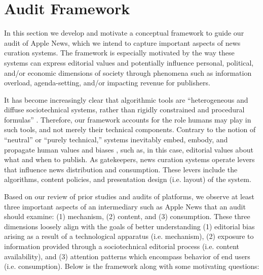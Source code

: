 \section{Audit Framework}\label{sec-framework}

In this section we develop and motivate a conceptual framework to guide our audit of Apple News, which we intend to capture important aspects of news curation systems. The framework is especially motivated by the way these systems can express editorial values and potentially influence personal, political, and/or economic dimensions of society through phenomena such as information overload, agenda-setting, and/or impacting  revenue for publishers.

It has become increasingly clear that algorithmic tools are ``heterogeneous and diffuse sociotechnical systems, rather than rigidly constrained and procedural formulas'' \citep{Seaver2017}. Therefore, our framework accounts for the role humans may play in such tools, and not merely their technical components. Contrary to the notion of ``neutral'' or ``purely technical,'' systems inevitably embed, embody, and propagate human values and biases \citep{Weizenbaum1976,Friedman1996,Introna2000,ONeil}, such as, in this case, editorial values about what and when to publish. As gatekeepers, news curation systems operate levers that  influence news distribution and consumption. These levers include the algorithms, content policies, and presentation design (i.e. layout) of the system.

Based on our review of prior studies and audits of platforms, we observe at least three important aspects of an intermediary such as Apple News that an audit should examine: (1) mechanism, (2) content, and (3) consumption. These three dimensions loosely align with the goals of better understanding (1) editorial bias arising as a result of a technological apparatus (i.e. mechanism), (2) exposure to information provided through a sociotechnical editorial process (i.e. content availability), and (3) attention patterns which encompass behavior of end users (i.e. consumption). Below is the framework along with some motivating questions:

